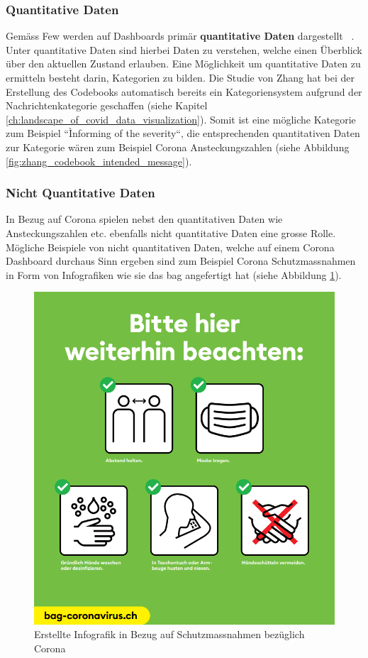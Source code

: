 \subsubsection{Quantitative Daten}
Gemäss Few werden auf Dashboards primär \textbf{quantitative Daten} dargestellt ~\citep[S. 43]{information_dashboard_design}. Unter quantitative Daten sind hierbei Daten zu verstehen, welche einen Überblick über den aktuellen Zustand erlauben. Eine Möglichkeit um quantitative Daten zu ermitteln besteht darin, Kategorien zu bilden. Die Studie von Zhang hat bei der Erstellung des Codebooks automatisch bereits ein Kategoriensystem aufgrund der Nachrichtenkategorie geschaffen (siehe Kapitel \ref{ch:landscape_of_covid_data_visualization}). Somit ist eine mögliche Kategorie zum Beispiel ``Ìnforming of the severity``, die entsprechenden quantitativen Daten zur Kategorie wären zum Beispiel Corona Ansteckungszahlen (siehe Abbildung \ref{fig:zhang_codebook_intended_message}). 

\subsubsection{Nicht Quantitative Daten}
In Bezug auf Corona spielen nebst den quantitativen Daten wie Ansteckungszahlen etc. ebenfalls nicht quantitative Daten eine grosse Rolle. Mögliche Beispiele von nicht quantitativen Daten, welche auf einem Corona Dashboard durchaus Sinn ergeben sind zum Beispiel Corona Schutzmassnahmen in Form von Infografiken wie sie das \gls{bag} angefertigt hat (siehe Abbildung \ref{fig:bag_infographic}).


 \begin{figure}[h]
    \includegraphics[width=12cm]{images/bag_covid_infographic.png}
    \centering
    \caption{Erstellte Infografik in Bezug auf Schutzmassnahmen bezüglich Corona ~\citep[S. 1]{bag_covid_infographic}}
    \label{fig:bag_infographic}
\end{figure}
 

